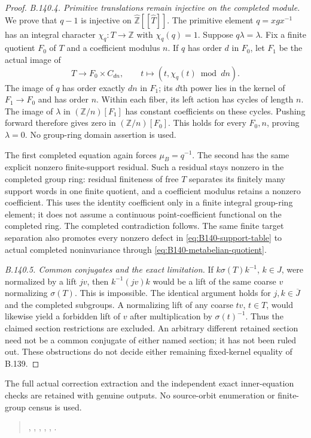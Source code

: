\begin{proof}
\emph{B.140.4. Primitive translations remain injective on the completed module.}
We prove that $q-1$ is injective on
$\widehat{\mathbb Z}[[\widehat T]]$.
The primitive element $q=xgx^{-1}$ has an integral
character $\chi_q:T\to\mathbb Z$ with $\chi_q(q)=1$.
Suppose $q\lambda=\lambda$.
Fix a finite quotient $F_0$ of $T$ and a coefficient
modulus $n$. If $q$ has order $d$ in $F_0$, let $F_1$
be the actual image of
\[
 T\longrightarrow F_0\times C_{dn},
 \qquad t\longmapsto(t,\chi_q(t)\bmod dn).
\]
The image of $q$ has order exactly $dn$ in $F_1$;
its $d$th power lies in the kernel of $F_1\to F_0$
and has order $n$.
Within each fiber, its left action has cycles of length
$n$. The image of $\lambda$ in $(\mathbb Z/n)[F_1]$
has constant coefficients on these cycles.
Pushing forward therefore gives zero in
$(\mathbb Z/n)[F_0]$.
This holds for every $F_0,n$, proving $\lambda=0$.
No group-ring domain assertion is used.

The first completed equation again forces
$\mu_B=q^{-1}$. The second has the same explicit
nonzero finite-support residual.
Such a residual stays nonzero in the completed group
ring: residual finiteness of free $T$ separates its
finitely many support words in one finite quotient,
and a coefficient modulus retains a nonzero coefficient.
This uses the identity coefficient only in a finite
integral group-ring element; it does not assume a
continuous point-coefficient functional on the
completed ring.
The completed contradiction follows. The same finite
target separation also promotes every nonzero defect
in \eqref{eq:B140-support-table} to actual completed
noninvariance through \eqref{eq:B140-metabelian-quotient}.

\emph{B.140.5. Common conjugates and the exact limitation.}
If $k\sigma(T)k^{-1}$, $k\in J$, were normalized by a
lift $jv$, then $k^{-1}(jv)k$ would be a lift of the
same coarse $v$ normalizing $\sigma(T)$.
This is impossible. The identical argument holds
for $j,k\in\overline J$ and the completed subgroups.
A normalizing lift of any coarse $tv$, $t\in T$,
would likewise yield a forbidden lift of $v$ after
multiplication by $\sigma(t)^{-1}$.
Thus the claimed section restrictions are excluded.
An arbitrary different retained section need not be
a common conjugate of either named section; it has
not been ruled out. These obstructions do not decide
either remaining fixed-kernel equality of B.139.
\end{proof}

The full actual correction extraction and the independent
exact inner-equation checks are retained with genuine outputs.
No source-orbit enumeration or finite-group census is used.
\begin{quote}\footnotesize\raggedright
{},
,
,
,
,
.
\end{quote}
